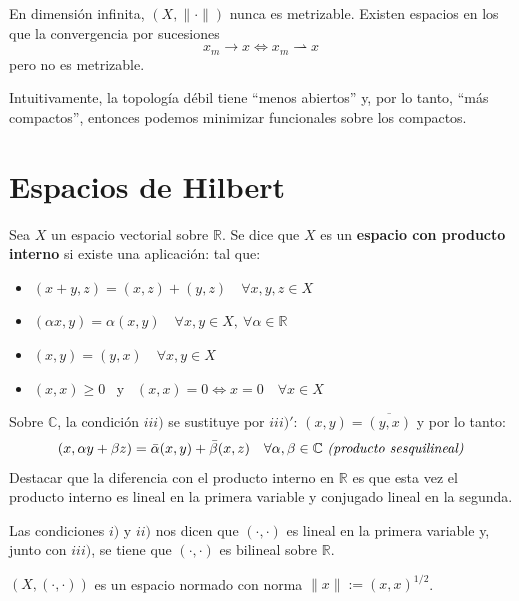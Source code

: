 \documentclass[12pt]{book}
\newcommand{\R}{\mathbb{R}}
\begin{document}
\begin{observacion}
    En dimensión infinita, $(X, \|\cdot\|)$ nunca es metrizable. Existen espacios en los que la convergencia por sucesiones 
    $$x_m \to x \iff x_m \rightharpoonup x$$
    pero no es metrizable. 
\end{observacion}


\noindent
Intuitivamente, la topología débil tiene ``menos abiertos'' y, por lo tanto, ``más compactos'', entonces podemos minimizar funcionales sobre los compactos.

\chapter{Espacios de Hilbert}

\begin{definicion}
    Sea $X$ un espacio vectorial sobre $\mathbb{R}$. Se dice que $X$ es un \textbf{espacio con producto interno} si existe una aplicación:
    tal que:
    \begin{itemize}
        \item[i)] $(x + y, z) = (x, z) + (y, z) \quad \forall x, y, z \in X$
        \item[ii)] $(\alpha x, y) = \alpha(x, y) \quad \forall x, y \in X, \ \forall \alpha \in \mathbb{R}$
        \item[iii)] $(x, y) = (y, x) \quad \forall x, y \in X$
        \item[iv)] $(x, x) \geq0$ \ y \ $(x, x) = 0 \iff x = 0 \quad \forall x \in X$
    \end{itemize}
    Sobre $\mathbb{C}$, la condición $iii)$ se sustituye por $iii)'$: $(x, y) = \overline{(y, x)}$ y por lo tanto:
        $$(x, \alpha y + \beta z) = \bar{\alpha}(x, y) + \bar{\beta}(x, z) \quad \forall \alpha, \beta \in \mathbb{C} \text{ \textit{(producto sesquilineal)}}$$
    Destacar que la diferencia con el producto interno en $\R$ es que esta vez el producto interno es lineal en la primera variable y conjugado lineal en la segunda.
\end{definicion}

\begin{observacion}
    Las condiciones $i)$ y $ii)$ nos dicen que $(\cdot, \cdot)$ es lineal en la primera variable y, junto con $iii)$, se tiene que $(\cdot, \cdot)$ es bilineal sobre $\mathbb{R}$.
\end{observacion}


\begin{observacion}
    $(X, (\cdot, \cdot))$ es un espacio normado con norma $\|x\| := (x, x)^{1/2}$. \\
\end{observacion}
\end{document}
